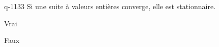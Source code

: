 \begin{truefalse}{q-1133}
Si une suite à valeurs entières converge, elle est stationnaire. 
\item* Vrai
\item Faux
\end{truefalse}

